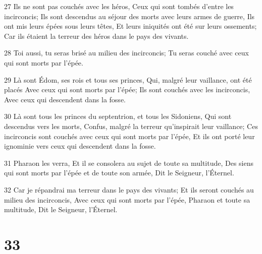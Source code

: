 \par 27 Ils ne sont pas couchés avec les héros, Ceux qui sont tombés d'entre les incirconcis; Ils sont descendus au séjour des morts avec leurs armes de guerre, Ils ont mis leurs épées sous leurs têtes, Et leurs iniquités ont été sur leurs ossements; Car ils étaient la terreur des héros dans le pays des vivants.
\par 28 Toi aussi, tu seras brisé au milieu des incirconcis; Tu seras couché avec ceux qui sont morts par l'épée.
\par 29 Là sont Édom, ses rois et tous ses princes, Qui, malgré leur vaillance, ont été placés Avec ceux qui sont morts par l'épée; Ils sont couchés avec les incirconcis, Avec ceux qui descendent dans la fosse.
\par 30 Là sont tous les princes du septentrion, et tous les Sidoniens, Qui sont descendus vers les morts, Confus, malgré la terreur qu'inspirait leur vaillance; Ces incirconcis sont couchés avec ceux qui sont morts par l'épée, Et ils ont porté leur ignominie vers ceux qui descendent dans la fosse.
\par 31 Pharaon les verra, Et il se consolera au sujet de toute sa multitude, Des siens qui sont morts par l'épée et de toute son armée, Dit le Seigneur, l'Éternel.
\par 32 Car je répandrai ma terreur dans le pays des vivants; Et ils seront couchés au milieu des incirconcis, Avec ceux qui sont morts par l'épée, Pharaon et toute sa multitude, Dit le Seigneur, l'Éternel.

\chapter{33}

